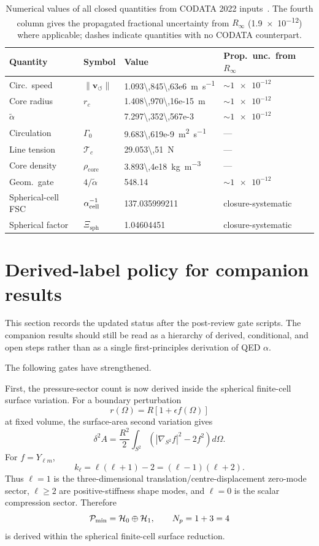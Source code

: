 \documentclass[aps,pra,preprint,longbibliography,nofootinbib]{revtex4-2}
\newcommand{\vnorm}{\lVert\mathbf{v}_{\!\boldsymbol{\circlearrowleft}}\rVert} %
\newcommand{\rhocore}{\rho_{\mathrm{core}}}      %
\newcommand{\rc}{r_c}                            %
\newcommand{\Rinf}{R_\infty}                     %
\newcommand{\Tc}{\mathcal{T}_c}                  %
\newcommand{\Gz}{\Gamma_0}                       %
\newcommand{\Xsph}{\Xi_{\mathrm{sph}}}             %
\begin{document}
\begin{table}[h]
\centering
\caption{Numerical values of all closed quantities from CODATA 2022
inputs~\cite{MohrTaylor2022}.
The fourth column gives the propagated fractional uncertainty from $\Rinf$
(\num{1.9e-12}) where applicable; dashes indicate quantities with no
CODATA counterpart.}
\label{tab:numbers}
\begin{tabular}{llll}
\toprule
Quantity & Symbol & Value & Prop.\ unc.\ from $\Rinf$ \\
\midrule
Circ.\ speed   & $\vnorm$ & \SI{1.093\,845\,63e6}{\m\per\s}      & $\sim\num{1e-12}$ \\
Core radius    & $\rc$    & \SI{1.408\,970\,16e-15}{\meter}       & $\sim\num{1e-12}$ \\
$\tilde\alpha$ &          & \num{7.297\,352\,567e-3}              & $\sim\num{1e-12}$ \\
Circulation    & $\Gz$    & \SI{9.683\,619e-9}{\m\squared\per\s}  & — \\
Line tension   & $\Tc$    & \SI{29.053\,51}{\newton}               & — \\
Core density   & $\rhocore$& \SI{3.893\,4e18}{\kg\per\m\cubed}    & — \\
Geom.\ gate    & $4/\tilde\alpha$ & \num{548.14}               & $\sim\num{1e-12}$ \\
Spherical-cell FSC & $\alpha_{\rm cell}^{-1}$ & \num{137.035999211} & closure-systematic \\
Spherical factor & $\Xsph$ & \num{1.04604451} & closure-systematic \\
\bottomrule
\end{tabular}
\end{table}


\section{Derived-label policy for companion results}
\label{sec:derived-label-policy}

This section records the updated status after the post-review gate scripts.  The
companion results should still be read as a hierarchy of derived, conditional,
and open steps rather than as a single first-principles derivation of QED
\(\alpha\).

The following gates have strengthened.

First, the pressure-sector count is now derived inside the spherical finite-cell
surface variation.  For a boundary perturbation
\[
  r(\Omega)=R[1+\epsilon f(\Omega)]
\]
at fixed volume, the surface-area second variation gives
\[
  \delta^2 A
  =
  \frac{R^2}{2}
  \int_{S^2}\left(|\nabla_{S^2}f|^2-2f^2\right)d\Omega .
\]
For \(f=Y_{\ell m}\),
\[
  k_\ell=\ell(\ell+1)-2=(\ell-1)(\ell+2).
\]
Thus \(\ell=1\) is the three-dimensional translation/centre-displacement
zero-mode sector, \(\ell\ge2\) are positive-stiffness shape modes, and
\(\ell=0\) is the scalar compression sector.  Therefore
\[
  \mathcal P_{\rm min}=\mathcal H_0\oplus\mathcal H_1,
  \qquad
  N_p=1+3=4
\]
is derived within the spherical finite-cell surface reduction.
\end{document}
